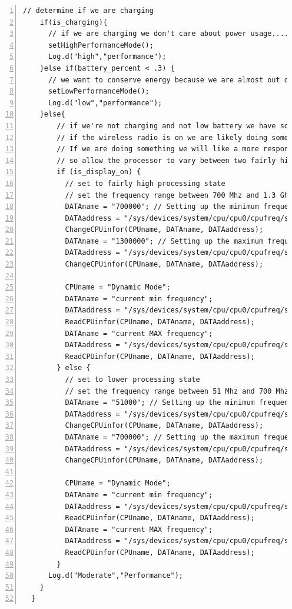 \documentclass{article} %
\begin{document}
\begin{lstlisting}[float=*,caption={Dynamic Frequency Scaling Mode II (continued)},label={lst:DFS_2_2},numbers=left]
// determine if we are charging
    if(is_charging){
      // if we are charging we don't care about power usage.... set to high performance mode
      setHighPerformanceMode();
      Log.d("high","performance");
    }else if(battery_percent < .3) {
      // we want to conserve energy because we are almost out of it, set to low performance mode
      setLowPerformanceMode();
      Log.d("low","performance");
    }else{
        // if we're not charging and not low battery we have some decisions to make
        // if the wireless radio is on we are likely doing something online.
        // If we are doing something we will like a more responsive device
        // so allow the processor to vary between two fairly high frequency states
        if (is_display_on) {
          // set to fairly high processing state
          // set the frequency range between 700 Mhz and 1.3 Ghz
          DATAname = "700000"; // Setting up the minimum frequency 51 Mhz
          DATAaddress = "/sys/devices/system/cpu/cpu0/cpufreq/scaling_min_freq";
          ChangeCPUinfor(CPUname, DATAname, DATAaddress);
          DATAname = "1300000"; // Setting up the maximum frequency at 1300 MHz
          DATAaddress = "/sys/devices/system/cpu/cpu0/cpufreq/scaling_max_freq";
          ChangeCPUinfor(CPUname, DATAname, DATAaddress);

          CPUname = "Dynamic Mode";
          DATAname = "current min frequency";
          DATAaddress = "/sys/devices/system/cpu/cpu0/cpufreq/scaling_min_freq";
          ReadCPUinfor(CPUname, DATAname, DATAaddress);
          DATAname = "current MAX frequency";
          DATAaddress = "/sys/devices/system/cpu/cpu0/cpufreq/scaling_max_freq";
          ReadCPUinfor(CPUname, DATAname, DATAaddress);
        } else {
          // set to lower processing state
          // set the frequency range between 51 Mhz and 700 Mhz
          DATAname = "51000"; // Setting up the minimum frequency 51 Mhz
          DATAaddress = "/sys/devices/system/cpu/cpu0/cpufreq/scaling_min_freq";
          ChangeCPUinfor(CPUname, DATAname, DATAaddress);
          DATAname = "700000"; // Setting up the maximum frequency at 1300 MHz
          DATAaddress = "/sys/devices/system/cpu/cpu0/cpufreq/scaling_max_freq";
          ChangeCPUinfor(CPUname, DATAname, DATAaddress);

          CPUname = "Dynamic Mode";
          DATAname = "current min frequency";
          DATAaddress = "/sys/devices/system/cpu/cpu0/cpufreq/scaling_min_freq";
          ReadCPUinfor(CPUname, DATAname, DATAaddress);
          DATAname = "current MAX frequency";
          DATAaddress = "/sys/devices/system/cpu/cpu0/cpufreq/scaling_max_freq";
          ReadCPUinfor(CPUname, DATAname, DATAaddress);
        }
      Log.d("Moderate","Performance");
    }
  }
\end{lstlisting}
\end{document}
